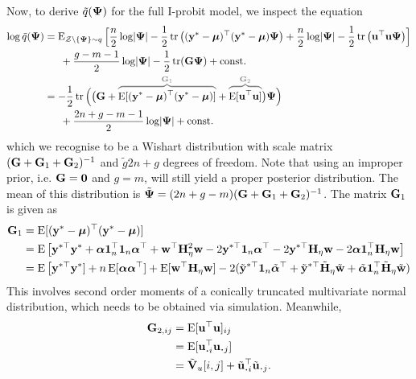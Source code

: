 Now, to derive $\tilde q({\bm\Psi})$ for the full I-probit model, we inspect the equation
\begin{align*}
  \log \tilde q(\bPsi)
  &= \E_{\cZ\backslash\{\bPsi\}\sim q} \Big[ 
  \half[n]\log\abs{\bPsi} - \half\tr \big((\by^* - \bmu)^\top (\by^* - \bmu)\bPsi  \big)
  + \half[n]\log\abs{\bPsi} - \half\tr \big( \bu^\top\bu\bPsi  \big)
  \Big] \\
  &\phantom{==} + \half[g-m-1]\log \abs{\bPsi} - \half\tr(\bG\bPsi) + \const \\
  &= -\half \tr \Big(
  \big(\bG + 
  \greyoverbrace{\E[(\by^* - \bmu)^\top (\by^* - \bmu)]}{\bG_1} +
  \greyoverbrace{\E[\bu^\top\bu]}{\bG_2}
  \big)\bPsi
  \Big) \\
  &\phantom{==} + \half[2n+g-m-1]\log \abs{\bPsi} + \const
\end{align*}
which we recognise to be a Wishart distribution with scale matrix $({\mathbf G} + {\mathbf G}_1 + {\mathbf G}_2)^{-1}$ and $\tilde g 2n+g$ degrees of freedom.
Note that using an improper prior, i.e. ${\mathbf G}={\mathbf 0}$ and $g=m$, will still yield a proper posterior distribution.
The mean of this distribution is $\tilde{{\bm\Psi}} = (2n+g-m)({\mathbf G} + {\mathbf G}_1 + {\mathbf G}_2)^{-1}$.
The matrix ${\mathbf G}_1$ is given as
\begin{align*}
  {\mathbf G}_1 
  &= \operatorname{E}[({\mathbf y}^* - {\bm\mu})^\top ({\mathbf y}^* - {\bm\mu})] \\
  &= \operatorname{E} \big[{\mathbf y}^{*\top}{\mathbf y}^* + {\bm\alpha}{\mathbf 1}_n^\top {\mathbf 1}_n{\bm\alpha}^\top + {\mathbf w}^\top{\mathbf H}_\eta^2{\mathbf w} -2{\mathbf y}^{*\top}{\mathbf 1}_n{\bm\alpha}^\top -2{\mathbf y}^{*\top}{\mathbf H}_\eta{\mathbf w} -2 {\bm\alpha}{\mathbf 1}_n^\top{\mathbf H}_\eta{\mathbf w} \big] \\
  &= \operatorname{E} \big[{\mathbf y}^{*\top}{\mathbf y}^*] + n\operatorname{E}[{\bm\alpha}{\bm\alpha}^\top] + \operatorname{E}[{\mathbf w}^\top{\mathbf H}_\eta{\mathbf w}] -2(\tilde{{\mathbf y}}^{*\top}{\mathbf 1}_n\tilde{{\bm\alpha}}^\top + \tilde{{\mathbf y}}^{*\top}\tilde{{\mathbf H}}_\eta\tilde{{\mathbf w}} + \tilde{{\bm\alpha}}{\mathbf 1}_n^\top\tilde{{\mathbf H}}_\eta\tilde{{\mathbf w}})
\end{align*}
This involves second order moments of a conically truncated multivariate normal distribution, which needs to be obtained via simulation.
Meanwhile,
\begin{align*}
  \bG_{2,ij}
  &= \E[\bu^\top\bu]_{ij} \\
  &= \E[\bu_{\bigcdot i}^\top \bu_{\bigcdot j}] \\
  &= \tilde\bV_u[i,j] + \tilde\bu_{\bigcdot i}^\top  \tilde\bu_{\bigcdot j}.
\end{align*}


